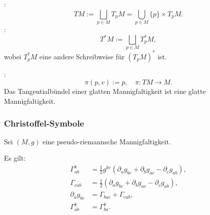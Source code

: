 :
\begin{equation}
TM := \bigsqcup_{p\in M} T_p M = \bigcup_{p\in M} \{p\}\times T_p M.
\end{equation}
:
\begin{equation}
T^*M := \bigsqcup_{p\in M} T_p^* M,
\end{equation}
wobei $T_p^* M$ eine andere Schreibweise für
$(T_p M)^*$ ist.

:
\begin{equation}
\pi(p,v):=p,\quad\pi\colon TM\to M.
\end{equation}
Das Tangentialbündel einer glatten Mannigfaltigkeit ist eine
glatte Mannigfaltigkeit.

\subsubsection{Christoffel-Symbole}
Sei $(M,g)$ eine pseudo-riemannsche Mannigfaltigkeit.

Es gilt:
\begin{align}
\Gamma_{ab}^k &= \frac{1}{2} g^{kc}
(\partial_a g_{bc}+\partial_b g_{ac}-\partial_c g_{ab}),\\
\Gamma_{cab} &= \frac{1}{2}
(\partial_a g_{bc}+\partial_b g_{ac}-\partial_c g_{ab}),\\
\partial_a g_{bc} &= \Gamma_{bac}+\Gamma_{cab},\\
\Gamma_{ab}^k &= \Gamma_{ba}^k.
\end{align}


